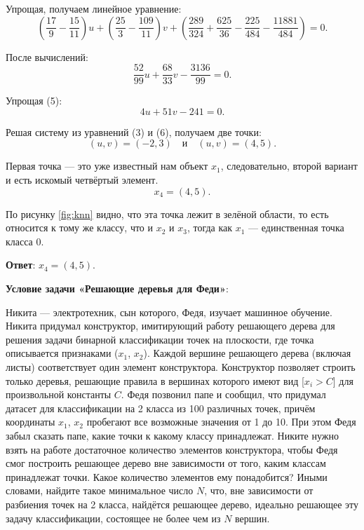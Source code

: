 \documentclass[pract]{SCWorks}
\begin{document}
    Упрощая, получаем линейное уравнение:
    \[
    \left(\frac{17}{9} - \frac{15}{11}\right)u + \left(\frac{25}{3} - \frac{109}{11}\right)v + \left(\frac{289}{324} + \frac{625}{36} - \frac{225}{484} - \frac{11881}{484}\right) = 0.
    \]

    После вычислений:
    \begin{equation}
    \frac{52}{99}u + \frac{68}{33}v - \frac{3136}{99} = 0.
    \end{equation}

    Упрощая (5):
    \begin{equation}
    4u + 51v - 241 = 0.
    \end{equation}

    Решая систему из уравнений (3) и (6), получаем две точки:
    \[
    (u,v) = (-2, 3) \quad \text{и} \quad (u,v) = (4, 5).
    \]

    Первая точка — это уже известный нам объект $x_1$, следовательно, второй вариант и есть искомый четвёртый элемент.
    \[
    \boxed{x_4 = (4, 5)}.
    \]

    По рисунку \ref{fig:knn} видно, что эта точка лежит в зелёной области, то есть относится к тому же классу, что и $x_2$ и $x_3$, тогда как $x_1$ — единственная точка класса 0.

    \textbf{Ответ}: $x_4 = (4, 5)$.

    \textbf{Условие задачи «Решающие деревья для Феди»}:

    Никита — электротехник, сын которого, Федя, изучает машинное обучение.
    Никита придумал конструктор, имитирующий работу решающего дерева для решения задачи бинарной классификации точек на плоскости, где точка описывается признаками ($x_1$, $x_2$).
    Каждой вершине решающего дерева (включая листы) соответствует один элемент конструктора.
    Конструктор позволяет строить только деревья, решающие правила в вершинах которого имеют вид [$x_i > C$] для произвольной константы $C$.
    Федя позвонил папе и сообщил, что придумал датасет для классификации на 2 класса из 100 различных точек, причём координаты $x_1$, $x_2$  пробегают все возможные значения от 1 до 10. При этом Федя забыл сказать папе, какие точки к какому классу принадлежат.
    Никите нужно взять на работе достаточное количество элементов конструктора, чтобы Федя смог построить решающее дерево вне зависимости от того, каким классам принадлежат точки.
    Какое количество элементов ему понадобится?
    Иными словами, найдите такое минимальное число $N$, что, вне зависимости от разбиения точек на 2 класса, найдётся решающее дерево, идеально решающее эту задачу классификации, состоящее не более чем из $N$ вершин.
\end{document}
